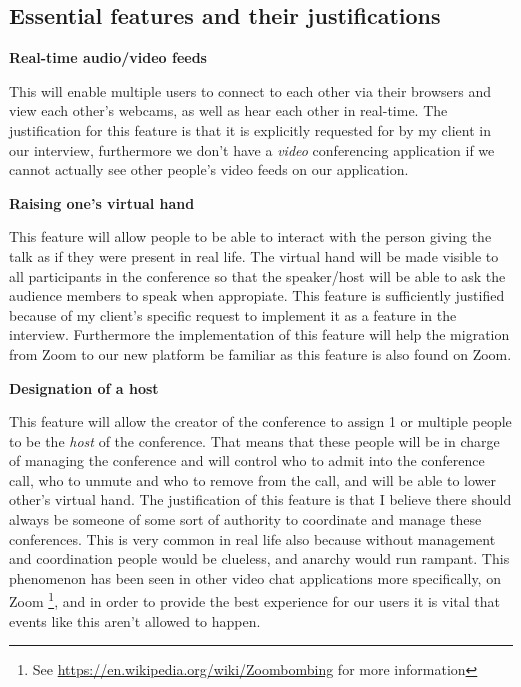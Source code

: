 \subsection{Essential features and their justifications}

\textbf{Real-time audio/video feeds} \\ \vspace{0.1cm}

This will enable multiple users to connect to each other via
their browsers and view each other's webcams, as well as hear
each other in real-time. The justification for this feature is
that it is explicitly requested for by my client in our
interview, furthermore we don't have a \textit{video}
conferencing application if we cannot actually see other 
people's video feeds on our application.

\vspace{0.2cm}

\textbf{Raising one's virtual hand} \\ \vspace{0.1cm}

This feature will allow people to be able to interact with the
person giving the talk as if they were present in real life.
The virtual hand will be made visible to all participants in 
the conference so that the speaker/host will be able to ask 
the audience members to speak when appropiate. This feature
is sufficiently justified because of my client's specific 
request to implement it as a feature in the interview. 
Furthermore the implementation of this feature will help the 
migration from Zoom to our new platform be familiar as this 
feature is also found on Zoom.

\vspace{0.2cm}

\textbf{Designation of a host} \\ \vspace{0.1cm}

This feature will allow the creator of the conference to 
assign 1 or multiple people to be the \textit{host} of the 
conference. That means that these people will be in charge of 
managing the conference and will control who to admit into the
conference call, who to unmute and who to remove from the call,
and will be able to lower other's virtual hand. The
justification of this feature is that I believe there should 
always be someone of some sort of authority to coordinate and 
manage these conferences. This is very common in real life also
because without management and coordination people would be 
clueless, and anarchy would run rampant. This phenomenon has
been seen in other video chat applications more specifically,
on Zoom \footnote{See 
\url{https://en.wikipedia.org/wiki/Zoombombing} for more 
information}, and in order to provide the best experience for
our users it is vital that events like this aren't allowed to
happen.

